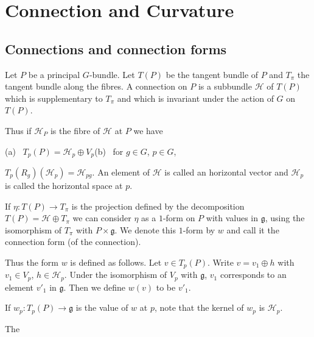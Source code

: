 \chapter{Connection and Curvature}\label{chap12}

\section*{Connections and connection forms}
\pageoriginale

\begin{defi*}
Let $P$ be a principal $G$-bundle. Let $T(P)$ be the tangent bundle of $P$ and $T_{\pi}$ the tangent bundle along the fibres. A connection on $P$ is a subbundle $\mathscr{H}$ of $T(P)$ which is supplementary to $T_{\pi}$ and which is invariant under the action of $G$ on $T(P)$.
\end{defi*}

Thus if $\mathscr{H}_{P}$ is the fibre of $\mathscr{H}$ at $P$ we have 
\begin{center}
(a)~ $T_{p}(P)=\mathscr{H}_{p}\oplus V_{p}$\qquad (b)~ for $g\in G$, $p\in G$,
\end{center}
$T_{p}(R_{g})(\mathscr{H}_{p})=\mathscr{H}_{pg}$. An element of $\mathscr{H}$ is called an horizontal vector and $\mathscr{H}_{p}$ is called the horizontal space at $p$.

If $\eta:T(P)\to T_{\pi}$ is the projection defined by the decomposition $T(P)=\mathscr{H}\oplus T_{\pi}$ we can consider $\eta$ as a $1$-form on $P$ with values in $\mathfrak{g}$, using the isomorphism of $T_{\pi}$ with $P\times \mathfrak{g}$. We denote this $1$-form by $w$ and call it the connection form (of the connection).

Thus the form $w$ is defined as follows. Let $v\in T_{p}(P)$. Write $v=v_{1}\oplus h$ with $v_{1}\in V_{p}$, $h\in \mathscr{H}_{p}$. Under the isomorphism of $V_{p}$ with $\mathfrak{g}$, $v_{1}$ corresponds to an element $v'_{1}$ in $\mathfrak{g}$. Then we define $w(v)$ to be $v'_{1}$.

If $w_{p}:T_{p}(P)\to \mathfrak{g}$ is the value of $w$ at $p$, note that the kernel of $w_{p}$ is $\mathscr{H}_{p}$.

The\pageoriginale 

